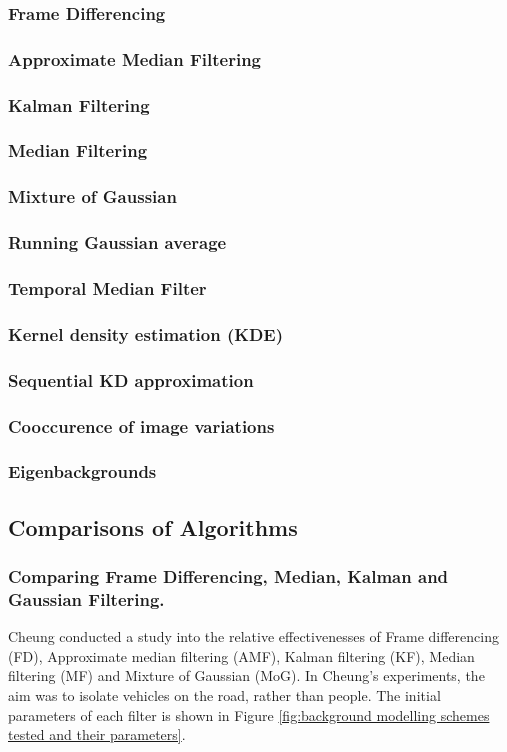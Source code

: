 \subsubsection{Frame Differencing}
\subsubsection{Approximate Median Filtering} \subsubsection{Kalman Filtering}
\subsubsection{Median Filtering}
\subsubsection{Mixture of Gaussian}
\subsubsection{Running Gaussian average}
\subsubsection{Temporal Median Filter}
\subsubsection{Kernel density estimation (KDE)}
\subsubsection{Sequential KD approximation}
\subsubsection{Cooccurence of image variations}
\subsubsection{Eigenbackgrounds}

\subsection{Comparisons of Algorithms}
\label{research: person isolation: comparisons}

\subsubsection{Comparing Frame Differencing, Median, Kalman and Gaussian Filtering.}
Cheung \cite{Cheung2007} conducted a study into the relative effectivenesses of Frame differencing (FD), Approximate median filtering (AMF), Kalman filtering (KF), Median filtering (MF) and Mixture of Gaussian (MoG). In Cheung's experiments, the aim was to isolate vehicles on the road, rather than people. The initial parameters of each filter is shown in Figure \ref{fig:background modelling schemes tested and their parameters}.\\

